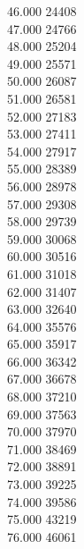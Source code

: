 { 46.000	24408 \\
 47.000	24766 \\
 48.000	25204 \\
 49.000	25571 \\
 50.000	26087 \\
 51.000	26581 \\
 52.000	27183 \\
 53.000	27411 \\
 54.000	27917 \\
 55.000	28389 \\
 56.000	28978 \\
 57.000	29308 \\
 58.000	29739 \\
 59.000	30068 \\
 60.000	30516 \\
 61.000	31018 \\
 62.000	31407 \\
 63.000	32640 \\
 64.000	35576 \\
 65.000	35917 \\
 66.000	36342 \\
 67.000	36678 \\
 68.000	37210 \\
 69.000	37563 \\
 70.000	37970 \\
 71.000	38469 \\
 72.000	38891 \\
 73.000	39225 \\
 74.000	39586 \\
 75.000	43219 \\
 76.000	46061 \\
}
